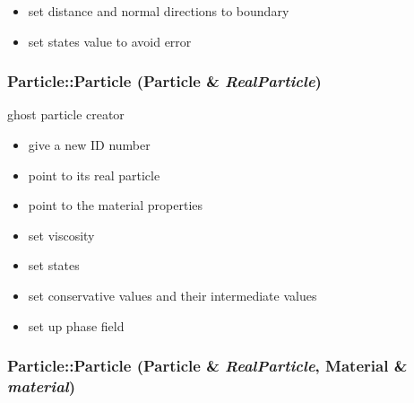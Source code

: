 \begin{itemize}
\item set distance and normal directions to boundary\end{itemize}


\begin{itemize}
\item set states value to avoid error \end{itemize}
\hypertarget{classParticle_0c88a1f547bae9946678288ff371acb2}{
\subsubsection[{Particle}]{\setlength{\rightskip}{0pt plus 5cm}Particle::Particle ({\bf Particle} \& {\em RealParticle})}}
\label{classParticle_0c88a1f547bae9946678288ff371acb2}


ghost particle creator 



\begin{itemize}
\item give a new ID number\end{itemize}


\begin{itemize}
\item point to its real particle\end{itemize}


\begin{itemize}
\item point to the material properties\end{itemize}


\begin{itemize}
\item set viscosity\end{itemize}


\begin{itemize}
\item set states\end{itemize}


\begin{itemize}
\item set conservative values and their intermediate values\end{itemize}


\begin{itemize}
\item set up phase field \end{itemize}
\hypertarget{classParticle_4f3ed6cdbd582d85e39622038205f0e1}{
\subsubsection[{Particle}]{\setlength{\rightskip}{0pt plus 5cm}Particle::Particle ({\bf Particle} \& {\em RealParticle}, \/  {\bf Material} \& {\em material})}}
\label{classParticle_4f3ed6cdbd582d85e39622038205f0e1}


